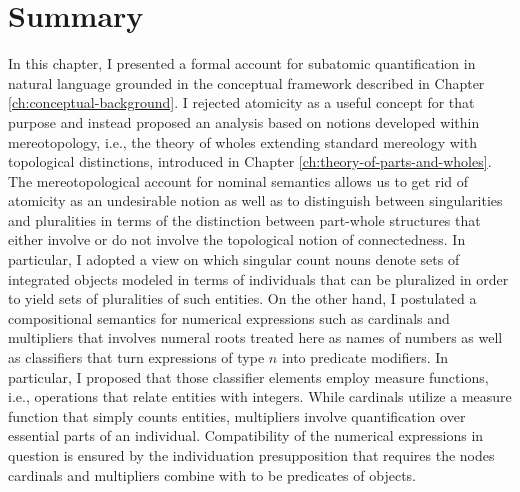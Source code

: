 	\section{Summary}\label{sec:summary-ch7}
	
	In this chapter, I presented a formal account for subatomic quantification in natural language grounded in the conceptual framework described in Chapter \ref{ch:conceptual-background}. I rejected atomicity as a useful concept for that purpose and instead proposed an analysis based on notions developed within mereotopology, i.e., the theory of wholes extending standard mereology with topological distinctions, introduced in Chapter \ref{ch:theory-of-parts-and-wholes}. The mereotopological account for nominal semantics allows us to get rid of atomicity as an undesirable notion as well as to distinguish between singularities and pluralities in terms of the distinction between part-whole structures that either involve or do not involve the topological notion of connectedness. In particular, I adopted a view on which singular count nouns denote sets of integrated objects modeled in terms of  individuals that can be pluralized in order to yield sets of pluralities of such entities. On the other hand, I postulated a compositional semantics for numerical expressions such as cardinals and multipliers that involves numeral roots treated here as names of numbers as well as classifiers that turn expressions of type $n$ into predicate modifiers. In particular, I proposed that those classifier elements employ measure functions, i.e., operations that relate entities with integers. While cardinals utilize a measure function that simply counts  entities, multipliers involve quantification over essential parts of an individual. Compatibility of the numerical expressions in question is ensured by the individuation presupposition that requires the nodes cardinals and multipliers combine with to be predicates of  objects.
	
